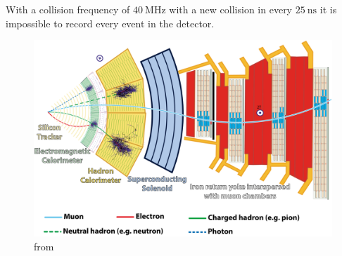 
With a collision frequency of $\SI{40}{\mega\hertz}$ with a new collision in every $\SI{25}{\nano\second}$ it is impossible to record every event in the detector.

\begin{figure}[h!]
	\centering
	\includegraphics[width=0.8\linewidth]{figures/theoryexperiment/CMS_Slice}
	\caption{from \cite{Barney:2120661}}
	\label{fig:cms_slice}
\end{figure}
